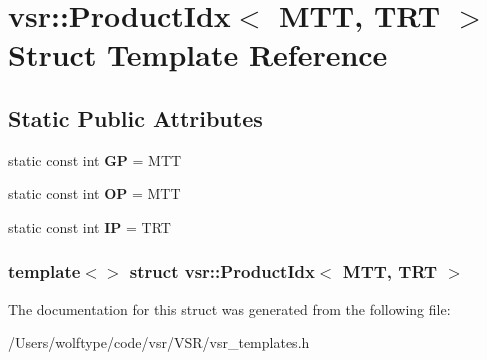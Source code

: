 \hypertarget{structvsr_1_1_product_idx_3_01_m_t_t_00_01_t_r_t_01_4}{\section{vsr\-:\-:Product\-Idx$<$ M\-T\-T, T\-R\-T $>$ Struct Template Reference}
\label{structvsr_1_1_product_idx_3_01_m_t_t_00_01_t_r_t_01_4}
}
\subsection*{Static Public Attributes}
\begin{DoxyCompactItemize}
\item 
\hypertarget{structvsr_1_1_product_idx_3_01_m_t_t_00_01_t_r_t_01_4_adaed88ca1fdb734a381c92a70ac7081b}{static const int {\bfseries G\-P} = M\-T\-T}\label{structvsr_1_1_product_idx_3_01_m_t_t_00_01_t_r_t_01_4_adaed88ca1fdb734a381c92a70ac7081b}

\item 
\hypertarget{structvsr_1_1_product_idx_3_01_m_t_t_00_01_t_r_t_01_4_a0263f5a785d51bfdf83030c97e6a9570}{static const int {\bfseries O\-P} = M\-T\-T}\label{structvsr_1_1_product_idx_3_01_m_t_t_00_01_t_r_t_01_4_a0263f5a785d51bfdf83030c97e6a9570}

\item 
\hypertarget{structvsr_1_1_product_idx_3_01_m_t_t_00_01_t_r_t_01_4_a941186fe1fbf9adeb8d45bc72a486cfd}{static const int {\bfseries I\-P} = T\-R\-T}\label{structvsr_1_1_product_idx_3_01_m_t_t_00_01_t_r_t_01_4_a941186fe1fbf9adeb8d45bc72a486cfd}

\end{DoxyCompactItemize}
\subsubsection*{template$<$$>$ struct vsr\-::\-Product\-Idx$<$ M\-T\-T, T\-R\-T $>$}



The documentation for this struct was generated from the following file\-:\begin{DoxyCompactItemize}
\item 
/\-Users/wolftype/code/vsr/\-V\-S\-R/vsr\-\_\-templates.\-h\end{DoxyCompactItemize}
